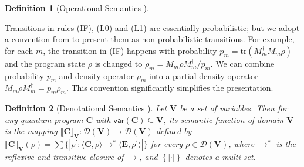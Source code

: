 \documentclass[conference,compsoc, 10pt]{IEEEtran}
\newtheorem{definition}{Definition}[section]
\newcommand {\qbar} {{\overline{q}}}
\newcommand {\emptyprog} {{\mathbf{E}}}
\newcommand {\tr } {{\mathrm{tr}}}
\newcommand {\vars } {\mathbf{V}}
\newcommand {\var } {\mathsf{var}}
\newcommand {\prog } {{\mathbf{C}}}
\newcommand {\sem}[1] {\llbracket#1\rrbracket}
\begin{document}
\begin{definition}[Operational Semantics \cite{Ying11}]
	\end{definition}
	
	Transitions in rules (IF), (L0) and (L1) are essentially probabilistic; but we adopt a convention from \cite{Sel04b} to present them as  non-probabilistic transitions. For example, for each $m$, the transition in (IF) happens with probability $p_m=\tr(M_m^\dag M_m\rho)$ and the  program state $\rho$ is changed to $\rho_m=M_m\rho M_m^\dag /p_m$. We can combine probability $p_m$ and density operator $\rho_m$ into a partial density operator $M_m\rho M_m^\dag=p_m\rho_m$. This convention significantly simplifies the presentation.
	
	\begin{definition}[Denotational Semantics \cite{Ying11}]
		\label{def den sem} 
		Let $\vars$ be a set	of variables. Then for any quantum program $\prog$ with $\var(\prog)\subseteq\vars$, its semantic function of domain $\vars$ is the mapping 
		$\sem{\prog}_{\vars}:\mathcal{D}(\vars)\rightarrow \mathcal{D}(\vars)$ defined by $\sem{\prog}_{\vars}(\rho)=\sum\{\!|\rho^\prime: \langle \prog,\rho\rangle\rightarrow^\ast\langle \emptyprog,\rho^\prime\rangle|\!\}$ for every $\rho\in\mathcal{D}(\vars)$, where $\rightarrow^\ast$ is the reflexive and transitive closure of $\rightarrow$, and $\left\{\!|\cdot|\!\right\}$ denotes a multi-set.
	\end{definition}
	
\end{document}
